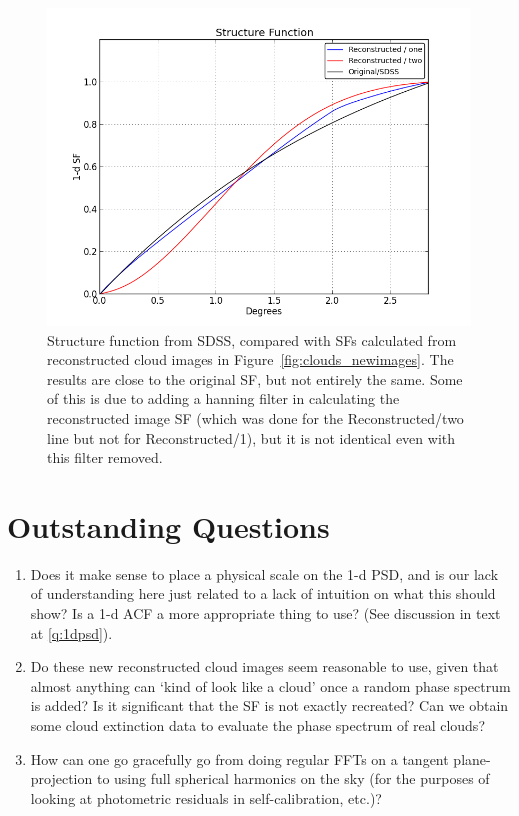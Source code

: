 \documentclass[11pt,preprint]{aastex}
\begin{document}
\begin{figure}[htpb]
\centering
\includegraphics[width=5in]{clouds_sf_new}
\caption{{\small
Structure function from SDSS, compared with SFs calculated from reconstructed cloud images in Figure~\ref{fig:clouds_newimages}. The results are close to the original SF, but not entirely the same. Some of this is due to adding a hanning filter in calculating the reconstructed image SF (which was done for the Reconstructed/two line but not for Reconstructed/1), but it is not identical even with this filter removed. }}
\label{fig:clouds_sf_new}
\end{figure}


\section{Outstanding Questions}
\begin{enumerate}
\item{Does it make sense to place a physical scale on the 1-d PSD, and is our lack of understanding here just related to a lack of intuition on what this should show? Is a 1-d ACF a more appropriate thing to use? (See discussion in text at \ref{q:1dpsd}).}
\item{Do these new reconstructed cloud images seem reasonable to use, given that almost anything can `kind of look like a cloud' once a random phase spectrum is added? Is it significant that the SF is not exactly recreated? Can we obtain some cloud extinction data to evaluate the phase spectrum of real clouds?}
\item{How can one go gracefully go from doing regular FFTs on a tangent plane-projection to using full spherical harmonics on the sky (for the purposes of looking at photometric residuals in self-calibration, etc.)?}
\end{enumerate}
\end{document}

